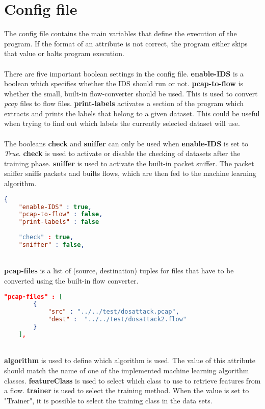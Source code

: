 \section{Config file}
The config file contains the main variables that define the execution of the program. If the format of an attribute is not correct, the program either skips that value or halts program execution. \\
\\
There are five important boolean settings in the config file. \textbf{enable-IDS} is a boolean which specifies whether the IDS should run or not. \textbf{pcap-to-flow} is whether the small, built-in flow-converter should be used. This is used to convert \textit{pcap} files to flow files. \textbf{print-labels} activates a section of the program which extracts and prints the labels that belong to a given dataset. This could be useful when trying to find out which labels the currently selected dataset will use.  \\
\\
The booleans \textbf{check} and \textbf{sniffer} can only be used when \textbf{enable-IDS} is set to \textit{True}. \textbf{check} is used to activate or disable the checking of datasets after the training phase. \textbf{sniffer} is used to activate the built-in packet sniffer. The packet sniffer sniffs packets and builts flows, which are then fed to the machine learning algorithm. \\
\begin{lstlisting}[language=json,firstnumber=1,label={configmain}]
{
    "enable-IDS" : true,
    "pcap-to-flow" : false,
    "print-labels" : false
    
    "check" : true,
    "sniffer" : false,
\end{lstlisting}~\\
\noindent \textbf{pcap-files} is a list of (source, destination) tuples for files that have to be converted using the built-in flow converter. \\

\begin{lstlisting}[language=json,firstnumber=1]
    "pcap-files" : [
        {
            "src" : "../../test/dosattack.pcap",
            "dest" :  "../../test/dosattack2.flow"
        }
    ],
\end{lstlisting}~\\
\noindent \textbf{algorithm} is used to define which algorithm is used. The value of this attribute should match the name of one of the implemented machine learning algorithm classes. \textbf{featureClass} is used to select which class to use to retrieve  features from a flow. \textbf{trainer} is used to select the training method. When the value is set to "Trainer", it is possible to select the training class in the data sets. \\

